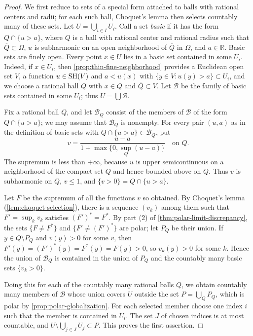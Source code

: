 \begin{proof}
We first reduce to sets of a special form attached to balls with rational centers and radii; for each such ball, Choquet's lemma then selects countably many of these sets. Let $U=\bigcup_{i\in I}U_i$. Call a set \emph{basic} if it has the form $Q\cap\{u>a\}$, where $Q$ is a ball with rational center and rational radius such that $\overline Q\subset\Omega$, $u$ is subharmonic on an open neighborhood of $\overline Q$ in $\Omega$, and $a\in\mathbb R$. Basic sets are finely open. Every point $x\in U$ lies in a basic set contained in some $U_i$. Indeed, if $x\in U_i$, then \cref{prop:thin-fine-neighborhood} provides a Euclidean open set $V$, a function $u\in\mathrm{SH}(V)$ and $a<u(x)$ with $\{y\in V:u(y)>a\}\subset U_i$, and we choose a rational ball $Q$ with $x\in Q$ and $\overline Q\subset V$. Let $\mathcal B$ be the family of basic sets contained in some $U_i$; thus $U=\bigcup\mathcal B$.

Fix a rational ball $Q$, and let $\mathcal B_Q$ consist of the members of $\mathcal B$ of the form $Q\cap\{u>a\}$; we may assume that $\mathcal B_Q$ is nonempty. For every pair $(u,a)$ as in the definition of basic sets with $Q\cap\{u>a\}\in\mathcal B_Q$, put
\[
 v=\frac{u-a}{1+\max\{0,\sup_Q(u-a)\}}\quad\text{on }Q.
\]
The supremum is less than $+\infty$, because $u$ is upper semicontinuous on a neighborhood of the compact set $\overline Q$ and hence bounded above on $\overline Q$. Thus $v$ is subharmonic on $Q$, $v\leq1$, and $\{v>0\}=Q\cap\{u>a\}$.

Let $F$ be the supremum of all the functions $v$ so obtained. By Choquet's lemma (\cref{lem:choquet-selection}), there is a sequence $(v_k)$ among them such that $F'=\sup_kv_k$ satisfies $(F')^*=F^*$. By part (2) of \cref{thm:polar-limit-discrepancy}, the sets $\{F\neq F^*\}$ and $\{F'\neq(F')^*\}$ are polar; let $P_Q$ be their union. If $y\in Q\setminus P_Q$ and $v(y)>0$ for some $v$, then $F'(y)=(F')^*(y)=F^*(y)=F(y)>0$, so $v_k(y)>0$ for some $k$. Hence the union of $\mathcal B_Q$ is contained in the union of $P_Q$ and the countably many basic sets $\{v_k>0\}$.

Doing this for each of the countably many rational balls $Q$, we obtain countably many members of $\mathcal B$ whose union covers $U$ outside the set $P=\bigcup_QP_Q$, which is polar by \cref{prop:polar-globalization}. For each selected member choose one index $i$ such that the member is contained in $U_i$. The set $J$ of chosen indices is at most countable, and $U\setminus\bigcup_{j\in J}U_j\subset P$. This proves the first assertion.


\end{proof}
